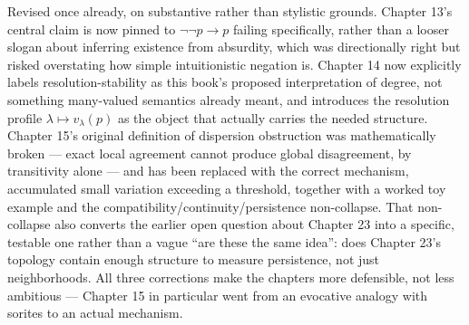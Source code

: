 Revised once already, on substantive rather than stylistic grounds.
Chapter 13's central claim is now pinned to \(\neg\neg p \to p\) failing
specifically, rather than a looser slogan about inferring existence from
absurdity, which was directionally right but risked overstating how
simple intuitionistic negation is. Chapter 14 now explicitly labels
resolution-stability as this book's proposed interpretation of degree,
not something many-valued semantics already meant, and introduces the
resolution profile \(\lambda \mapsto v_\lambda(p)\) as the object that
actually carries the needed structure. Chapter 15's original definition
of dispersion obstruction was mathematically broken --- exact local
agreement cannot produce global disagreement, by transitivity alone ---
and has been replaced with the correct mechanism, accumulated small
variation exceeding a threshold, together with a worked toy example and
the compatibility/continuity/persistence non-collapse. That non-collapse
also converts the earlier open question about Chapter 23 into a specific,
testable one rather than a vague ``are these the same idea'': does Chapter
23's topology contain enough structure to measure persistence, not just
neighborhoods. All three corrections make the chapters more defensible,
not less ambitious --- Chapter 15 in particular went from an evocative
analogy with sorites to an actual mechanism.
